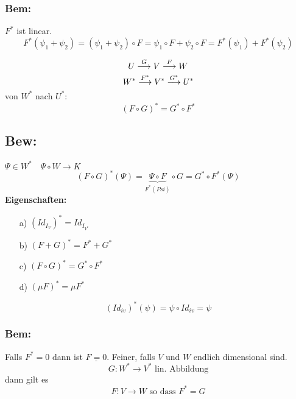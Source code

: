 \documentclass[titlepage,12pt,a4paper,ngerman]{report}
\newcommand{\tx}[1]{\textrm{#1}}
\newcommand{\ub}[1]{\underbrace{#1}}
\begin{document}

\subsubsection*{Bem:}
$F^*$ ist linear. 
$$F^* (\psi_1 + \psi_2) = (\psi_1 + \psi_2) \circ F = \psi_1 \circ F + \psi_2 \circ F = F^* (\psi_1) + F^* (\psi_2)$$

$$ U \buildrel G \over \longrightarrow V \buildrel F \over \longrightarrow W$$
$$ W^* \buildrel F^* \over \longrightarrow V^* \buildrel G^* \over \longrightarrow U^*$$
von $ W^* $ nach $ U^* $:
$$(F\circ G)^* = G^* \circ F^*$$
\subsection{Bew:} $ \Psi \in W^* \quad \Psi \circ W \to K $ 
$$(F \circ G)^*(\Psi) = \ub{\Psi\circ F}_{F^*(Psi)} \circ G = G^* \circ F^*(\Psi)$$
\textbf{Eigenschaften:}
\begin{itemize}
	\item[a)] $ (Id_{I_{V}})^* = Id_{I_{V^*}} $
	\item[b)] $ (F+G)^* = F^* + G^* $
	\item[c)] $ (F\circ G)^* = G^* \circ F^* $
	\item[d)] $ (\mu F)^* = \mu F^* $
\end{itemize}

$$(Id_{iv})^* (\psi) = \psi \circ Id_{iv} = \psi$$
\subsubsection*{Bem:}
Falls $F^* =0$ dann ist $\underline{F = 0}$. Feiner, falls $V$ und $W$ endlich dimensional sind.
$$G: W^* \to V^* \tx{ lin. Abbildung}$$ dann gilt es $$F: V \to W \tx{ so dass } F^* = G$$
\end{document}
